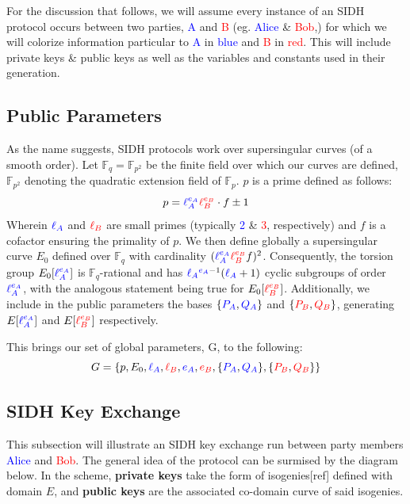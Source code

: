 For the discussion that follows, we will assume every instance of an SIDH protocol occurs between two parties, \textcolor{blue}{A} and \textcolor{red}{B} (eg. \textcolor{blue}{Alice} \& \textcolor{red}{Bob},) for which we will colorize information particular to \textcolor{blue}{A} in \textcolor{blue}{blue} and \textcolor{red}{B} in \textcolor{red}{red}. This will include private keys \& public keys as well as the variables and constants used in their generation.

\subsection{Public Parameters}

As the name suggests, SIDH protocols work over supersingular curves (of a smooth order). Let $\mathbb{F}_q = \mathbb{F}_{p^2}$ be the finite field over which our curves are defined, $\mathbb{F}_{p^2}$ denoting the quadratic extension field of $\mathbb{F}_{p}$.  $p$ is a prime defined as follows:
$$
p = \textcolor{blue}{\ell_{A}^{e_A}} \textcolor{red}{\ell_{B}^{e_B}} \cdot f \pm 1
$$
Wherein $\textcolor{blue}{\ell_{A}}$ and $\textcolor{red}{\ell_{B}}$ are small primes (typically \textcolor{blue}{2} \& \textcolor{red}{3}, respectively) and $f$ is a cofactor ensuring the primality of $p$. We then define globally a supersingular curve $E_0$ defined over $\mathbb{F}_q$ with cardinality $(\textcolor{blue}{\ell_{A}^{e_A}} \textcolor{red}{\ell_{B}^{e_B}} f)^2$. Consequently, the torsion group $E_0[\textcolor{blue}{\ell_{A}^{e_A}}]$ is $\mathbb{F}_q$-rational and has $\textcolor{blue}{\ell_{A}}^{\textcolor{blue}{e_A} - 1} (\textcolor{blue}{\ell_{A}} + 1)$ cyclic subgroups of order $\textcolor{blue}{\ell_{A}^{e_A}}$, with the analogous statement being true for $E_0[\textcolor{red}{\ell_{B}^{e_B}}]$. Additionally, we include in the public parameters the bases $\{\textcolor{blue}{P_A},\textcolor{blue}{Q_A}\}$ and $\{\textcolor{red}{P_B},\textcolor{red}{Q_B}\}$, generating $E[\textcolor{blue}{\ell_{A}^{e_A}}]$ and $E[\textcolor{red}{\ell_{B}^{e_B}}]$ respectively. 

This brings our set of global parameters, G, to the following:\\
$$
G = \{p,E_0,\textcolor{blue}{\ell_{A}},\textcolor{red}{\ell_{B}},\textcolor{blue}{e_A},\textcolor{red}{e_B},\{\textcolor{blue}{P_A},\textcolor{blue}{Q_A}\},\{\textcolor{red}{P_B},\textcolor{red}{Q_B}\}\}
$$



\subsection{SIDH Key Exchange}

This subsection will illustrate an SIDH key exchange run between party members \textcolor{blue}{Alice} and \textcolor{red}{Bob}. The general idea of the protocol can be surmised by the diagram below. In the scheme, \textbf{private keys} take the form of isogenies[ref] defined with domain $E$, and \textbf{public keys} are the associated co-domain curve of said isogenies.

